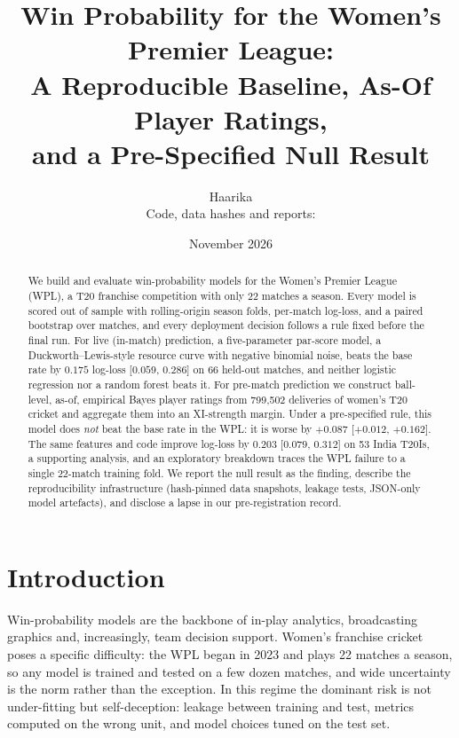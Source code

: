 \documentclass[11pt]{article}
\title{Win Probability for the Women's Premier League:\\
A Reproducible Baseline, As-Of Player Ratings,\\ and a Pre-Specified Null Result}
\author{Haarika\\ \small Code, data hashes and reports: \repo}
\date{November 2026}
\begin{document}
\maketitle

\begin{abstract}
We build and evaluate win-probability models for the Women's Premier League (WPL), a T20 franchise
competition with only 22 matches a season. Every model is scored out of sample with rolling-origin
season folds, per-match log-loss, and a paired bootstrap over matches, and every deployment decision
follows a rule fixed before the final run. For live (in-match) prediction, a five-parameter par-score
model, a Duckworth--Lewis-style resource curve with negative binomial noise, beats the base rate by
$0.175$ log-loss [$0.059$, $0.286$] on 66 held-out matches, and neither logistic regression nor a random
forest beats it. For pre-match prediction we construct ball-level, as-of, empirical Bayes player
ratings from 799{,}502 deliveries of women's T20 cricket and aggregate them into an XI-strength margin.
Under a pre-specified rule, this model does \emph{not} beat the base rate in the WPL: it is worse by
$+0.087$ [$+0.012$, $+0.162$]. The same features and code improve log-loss by $0.203$ [$0.079$, $0.312$] on
53 India T20Is, a supporting analysis, and an exploratory breakdown traces the WPL failure to a single
22-match training fold. We report the null result as the finding, describe the reproducibility
infrastructure (hash-pinned data snapshots, leakage tests, JSON-only model artefacts), and disclose a
lapse in our pre-registration record.
\end{abstract}

\section{Introduction}

Win-probability models are the backbone of in-play analytics, broadcasting graphics and, increasingly,
team decision support. Women's franchise cricket poses a specific difficulty: the WPL began in 2023 and
plays 22 matches a season, so any model is trained and tested on a few dozen matches, and wide
uncertainty is the norm rather than the exception. In this regime the dominant risk is not
under-fitting but self-deception: leakage between training and test, metrics computed on the wrong
unit, and model choices tuned on the test set.
\end{document}
